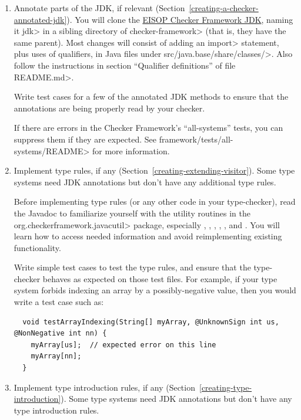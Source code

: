 \begin{enumerate}
\item
  Annotate parts of the JDK, if relevant
  (Section~\ref{creating-a-checker-annotated-jdk}).
  You will clone the \href{https://github.com/eisop/jdk}{EISOP Checker
  Framework JDK}, naming it \<jdk> in a sibling directory of
  \<checker-framework> (that is, they have the same parent).
  Most changes will consist of adding an \<import> statement, plus uses of
  qualifiers, in Java files under \<src/java.base/share/classes/>.
  Also follow the instructions in section ``Qualifier definitions'' of file
  \<README.md>.

  Write test cases for a few of the annotated JDK methods to ensure
  that the annotations are being properly read by your checker.

  If there are errors in the Checker Framework's ``all-systems'' tests, you can
  suppress them if they are expected. See \<framework/tests/all-systems/README>
  for more information.

\item
  Implement type rules, if any (Section~\ref{creating-extending-visitor}).
  Some type systems need JDK annotations but don't have any additional
  type rules.

  Before implementing type rules (or any other code in your type-checker),
  read the Javadoc to familiarize yourself with the utility routines in the
  \<org.checkerframework.javacutil> package, especially
  ,
  ,
  ,
  ,
  , and
  .
  You will learn how to access needed information and avoid
  reimplementing existing functionality.

  Write simple test cases to test the type rules, and ensure that the
  type-checker behaves as expected on those test files.
  For example, if your type system forbids indexing an array by a
  possibly-negative value, then you would write a test case such as:

\begin{Verbatim}
  void testArrayIndexing(String[] myArray, @UnknownSign int us, @NonNegative int nn) {
    myArray[us];  // expected error on this line
    myArray[nn];
  }
\end{Verbatim}

\item
  Implement type introduction rules, if any (Section~\ref{creating-type-introduction}).
  Some type systems need JDK annotations but don't have any type introduction rules.


\end{enumerate}
